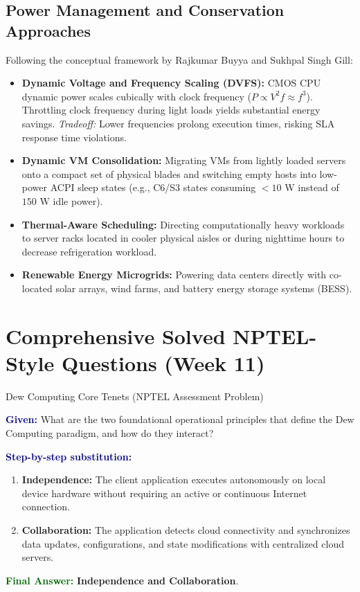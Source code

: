 \documentclass[11pt,a4paper,openany]{report}
\newcommand{\Given}{\par\textbf{\textcolor{navy}{Given:}} }
\newcommand{\Steps}{\par\textbf{\textcolor{navy}{Step-by-step substitution:}}\par}
\newcommand{\Answer}{\par\textbf{\textcolor{darkgreen}{Final Answer:}} }
\begin{document}
\subsection{Power Management and Conservation Approaches}
Following the conceptual framework by Rajkumar Buyya and Sukhpal Singh Gill:
\begin{itemize}[leftmargin=*]
  \item \textbf{Dynamic Voltage and Frequency Scaling (DVFS):} CMOS CPU dynamic power scales cubically with clock frequency ($P \propto V^2 f \approx f^3$). Throttling clock frequency during light loads yields substantial energy savings. \emph{Tradeoff:} Lower frequencies prolong execution times, risking SLA response time violations.
  \item \textbf{Dynamic VM Consolidation:} Migrating VMs from lightly loaded servers onto a compact set of physical blades and switching empty hosts into low-power ACPI sleep states (e.g., C6/S3 states consuming $<10\text{ W}$ instead of $150\text{ W}$ idle power).
  \item \textbf{Thermal-Aware Scheduling:} Directing computationally heavy workloads to server racks located in cooler physical aisles or during nighttime hours to decrease refrigeration workload.
  \item \textbf{Renewable Energy Microgrids:} Powering data centers directly with co-located solar arrays, wind farms, and battery energy storage systems (BESS).
\end{itemize}

\section{Comprehensive Solved NPTEL-Style Questions (Week 11)}

\begin{solved}{Dew Computing Core Tenets (NPTEL Assessment Problem)}
\Given What are the two foundational operational principles that define the Dew Computing paradigm, and how do they interact?
\Steps
\begin{enumerate}[leftmargin=*]
  \item \textbf{Independence:} The client application executes autonomously on local device hardware without requiring an active or continuous Internet connection.
  \item \textbf{Collaboration:} The application detects cloud connectivity and synchronizes data updates, configurations, and state modifications with centralized cloud servers.
\end{enumerate}
\Answer \textbf{Independence and Collaboration}.
\end{solved}
\end{document}
